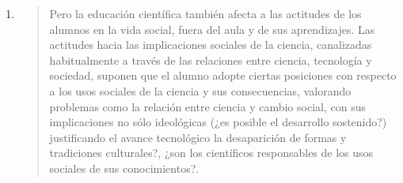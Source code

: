 \documentclass{article}
\begin{document}
\begin{enumerate}
  \item \begin{quote}
  Pero la educación científica también afecta a las actitudes de los alumnos en la vida social, fuera del aula y de sus aprendizajes. Las actitudes hacia las implicaciones sociales de la ciencia, canalizadas habitualmente a través de las relaciones entre ciencia, tecnología y sociedad, suponen que el alumno adopte ciertas posiciones con respecto a los usos sociales de la ciencia y sus consecuencias, valorando problemas como la relación entre ciencia y cambio social, con sus implicaciones no sólo ideológicas (¿es posible el desarrollo sostenido?) justificando el avance tecnológico la desaparición de formas y tradiciones culturales?, ¿son los científicos responsables de los usos sociales de sus conocimientos?.
  \end{quote}

\end{enumerate}
\end{document}
